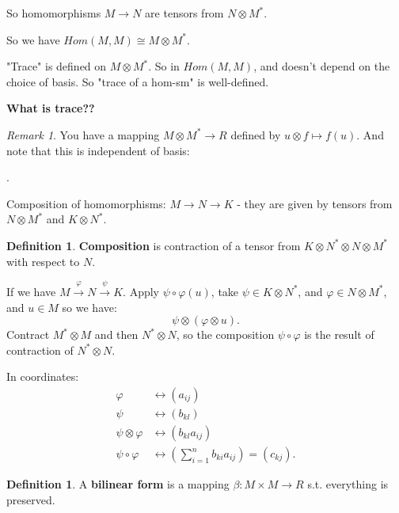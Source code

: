 \documentclass[9pt,reqno,twoside]{amsbook}
\theoremstyle{plain}
\numberwithin{section}{chapter}
\numberwithin{equation}{chapter}
\theoremstyle{definition}
\newtheorem{Def}[theorem]{Definition}
\theoremstyle{remark}
\newtheorem{rem}[theorem]{Remark}
\theoremstyle{plain}
\newcommand{\bb}{\vspace{3mm}}
\newcommand{\bee}{\begin{equation}\begin{aligned}}
\newcommand{\eee}{\end{aligned}\end{equation}}
\newcommand{\tens}{\otimes}
\newcommand{\lpar}{\left(}
\newcommand{\rpar}{\right)}
\renewcommand{\phi}{\varphi}
\begin{document}
So homomorphisms $M \to N$ are tensors from $N \tens M^*$. 

So we have $Hom(M,M) \cong M \tens M^*$. 

"Trace" is defined on $M \tens M^*$. So in $Hom(M,M)$, and doesn't depend on the choice of basis. So "trace of a hom-sm" is well-defined. 

\textbf{What is trace??}

\begin{rem}
You have a mapping $M \tens M^* \to R$ defined by $u \tens f \mapsto f(u)$. And note that this is independent of basis:
\begin{center}
.
\end{center}
\end{rem}

Composition of homomorphisms: $M \to N \to K$ - they are given by tensors from $N \tens M^*$ and $K \tens N^*$. 

\begin{Def}
\textbf{Composition} is contraction of a tensor from $K \tens N^* \tens N \tens M^*$ with respect to $N$. 
\end{Def}

If we have $M \overset{\phi}{\to}N \overset{\psi}{\to}K$. Apply $\psi \circ \phi(u)$, take $\psi \in K \tens N^*$, and $\phi \in N \tens M^*$, and $u \in M$ so we have:
$$
\psi \tens (\phi \tens u).
$$
Contract $M^* \tens M$ and then $N^* \tens N$, so the composition $\psi \circ \phi$ is the result of contraction of $N^* \tens N$. 

In coordinates: 
\bee 
\phi &\leftrightarrow (a_{ij})\\
\psi &\leftrightarrow (b_{kl})\\
\psi \tens \phi &\leftrightarrow (b_{kl}a_{ij})\\
\psi \circ \phi &\leftrightarrow \lpar \sum_{i = 1}^nb_{ki}a_{ij} \rpar  = (c_{kj}).
\eee


\bb\bb\bb

\begin{Def}
A \textbf{bilinear form} is a mapping $\beta:M \times M \to R$ s.t. everything is preserved. 
\end{Def}
\end{document}

